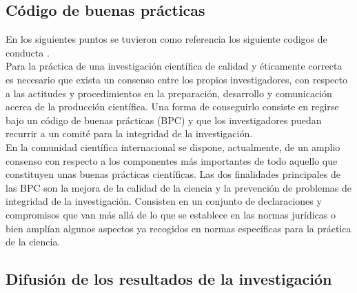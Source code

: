 \subsection{Código de buenas prácticas}
En los siguientes puntos se tuvieron como referencia los siguiente codigos de conducta \cite{ALLEA2018,Garcea1977,InstitutodeSaludCarlosIII2019,Tobergte2013}.\\
Para la práctica de una investigación científica de calidad y éticamente correcta es necesario que exista un consenso entre los propios 
investigadores, con respecto a las actitudes y procedimientos en la preparación, desarrollo y comunicación acerca de la producción 
científica. Una forma de conseguirlo consiste en regirse bajo un código de buenas prácticas (BPC) y que los investigadores puedan
recurrir a un comité para la integridad de la investigación.\\
En la comunidad científica internacional se dispone, actualmente, de un amplio consenso
con respecto a los componentes más importantes de todo aquello que constituyen unas
buenas prácticas científicas. Las dos finalidades principales de las BPC son la mejora
de la calidad de la ciencia y la prevención de problemas de integridad de la investigación.
Consisten en un conjunto de declaraciones y compromisos que van más allá de lo que se
establece en las normas jurídicas o bien amplían algunos aspectos ya recogidos en normas
específicas para la práctica de la ciencia.
\subsection{Difusión de los resultados de la investigación}
